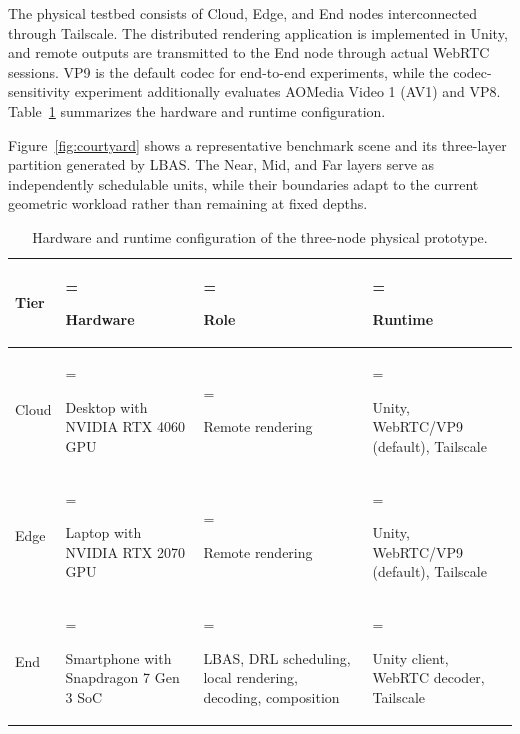 \documentclass[acmsmall]{acmart}
\begin{document}
	The physical testbed consists of Cloud, Edge, and End nodes interconnected through Tailscale. The distributed rendering application is implemented in Unity, and remote outputs are transmitted to the End node through actual WebRTC sessions. VP9 is the default codec for end-to-end experiments, while the codec-sensitivity experiment additionally evaluates AOMedia Video 1 (AV1) and VP8. Table~\ref{tab:prototype_config} summarizes the hardware and runtime configuration.
	
	
	Figure~\ref{fig:courtyard} shows a representative benchmark scene and its three-layer partition generated by LBAS. The Near, Mid, and Far layers serve as independently schedulable units, while their boundaries adapt to the current geometric workload rather than remaining at fixed depths.

	\begin{table}[tbp]
		\centering
		\caption{Hardware and runtime configuration of the three-node physical prototype.}
		\label{tab:prototype_config}
		\scriptsize
		\setlength{\tabcolsep}{3pt}
		\renewcommand{\arraystretch}{0.96}
		\begin{tabularx}{0.96\linewidth}{@{}l
			>{\hsize=1.15\hsize\linewidth=\hsize\raggedright\arraybackslash}X
			>{\hsize=0.95\hsize\linewidth=\hsize\raggedright\arraybackslash}X
			>{\hsize=0.90\hsize\linewidth=\hsize\raggedright\arraybackslash}X@{}}
				\toprule
				\textbf{Tier} & \textbf{Hardware} & \textbf{Role} & \textbf{Runtime} \\
				\midrule
				Cloud &
				Desktop with NVIDIA RTX 4060 GPU &
				Remote rendering &
				Unity, WebRTC/VP9 (default), Tailscale \\
				Edge &
				Laptop with NVIDIA RTX 2070 GPU &
				Remote rendering &
				Unity, WebRTC/VP9 (default), Tailscale \\
				End &
				Smartphone with Snapdragon 7 Gen 3 SoC &
				LBAS, DRL scheduling, local rendering, decoding, composition &
				Unity client, WebRTC decoder, Tailscale \\
				\bottomrule
		\end{tabularx}
	\end{table}
	
\end{document}
